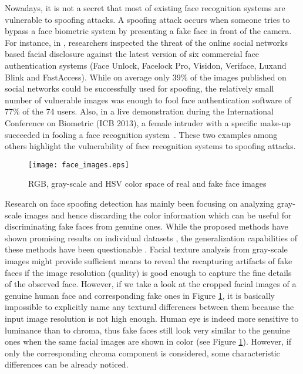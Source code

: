 \documentclass{article}
\begin{document}
Nowadays, it is not a secret that most of existing face recognition systems are vulnerable  to spoofing attacks.  A spoofing attack occurs when someone tries to bypass a face biometric system by presenting a fake face in front of the camera. For instance, in \cite{spoof_OSN}, researchers  inspected the threat of the online social networks based facial disclosure against  the  latest version of  six commercial face authentication systems (Face Unlock, Facelock Pro, Visidon, Veriface, Luxand Blink and FastAccess). While on average only 39\% of the images published on social networks could be successfully used for spoofing, the relatively small number of vulnerable images was enough to fool face authentication software of 77\% of the 74 users. Also, in a live demonstration during the International Conference on Biometric (ICB 2013), a female intruder with a specific make-up succeeded in fooling a face recognition system~\cite{tabula_rasa}. These two examples among others highlight the vulnerability of face recognition systems to spoofing attacks. 
\begin{figure}[t]
	\centering
		\texttt{[image: face\_images.eps]}
	\label{exemple_of_face_images}
	\vspace{-8mm}
	\caption{RGB, gray-scale and HSV color space  of real and fake face images}
\end{figure}
Research on face spoofing detection has mainly been focusing on analyzing gray-scale images \cite{micro_texture} \cite{replay} \cite{lbp_casia} and hence discarding the color information which can be useful for discriminating fake faces from genuine ones. While the proposed methods have shown promising results on individual datasets \cite{replay} \cite{lbp_casia}, the generalization capabilities of these methods have been questionable \cite{motion_casia}. Facial texture analysis from gray-scale images might provide sufficient means to reveal the recapturing artifacts of fake faces if the image resolution (quality) is good enough to capture the fine details of the observed face. However, if we take a look at the cropped facial images of a genuine human face and corresponding fake ones in Figure \ref{exemple_of_face_images}, it is basically impossible to explicitly name any textural differences between them because the input image resolution is not high enough. Human eye is indeed more sensitive to luminance than to chroma, thus fake faces still look very similar to the genuine ones when the same facial images are shown in color (see Figure \ref{exemple_of_face_images}). However, if only the corresponding chroma component is considered, some characteristic differences can be already noticed.
\end{document}
